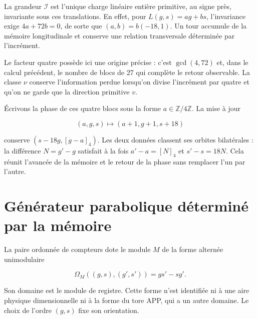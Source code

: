 La grandeur \(\mathcal I\) est l’unique charge linéaire entière primitive, au signe près, invariante sous ces translations. En effet, pour \(L(g,s)=ag+bs\), l’invariance exige \(4a+72b=0\), de sorte que \((a,b)=b(-18,1)\). Un tour accumule de la mémoire longitudinale et conserve une relation transversale déterminée par l’incrément.

Le facteur quatre possède ici une origine précise : c’est \(\gcd(4,72)\) et, dans le calcul précédent, le nombre de blocs de 27 qui complète le retour observable. La classe \(\nu\) conserve l’information perdue lorsqu’on divise l’incrément par quatre et qu’on ne garde que la direction primitive \(v\).

\begin{corollary}

Écrivons la phase de ces quatre blocs sous la forme \(a\in\mathbb Z/4\mathbb Z\). La mise à jour

\[
(a,g,s)\longmapsto(a+1,g+1,s+18)
\]

conserve \((s-18g,[g-a]_4)\). Les deux données classent ses orbites bilatérales : la différence \(N=g'-g\) satisfait à la fois \(a'-a=[N]_4\) et \(s'-s=18N\). Cela réunit l’avancée de la mémoire et le retour de la phase sans remplacer l’un par l’autre.
\end{corollary}

\section{Générateur parabolique déterminé par la mémoire}

La paire ordonnée de compteurs dote le module \(M\) de la forme alternée unimodulaire

\[
\Omega_M((g,s),(g',s'))=gs'-sg'.
\]

Son domaine est le module de registre. Cette forme n’est identifiée ni à une aire physique dimensionnelle ni à la forme du tore APP, qui a un autre domaine. Le choix de l’ordre \((g,s)\) fixe son orientation.

